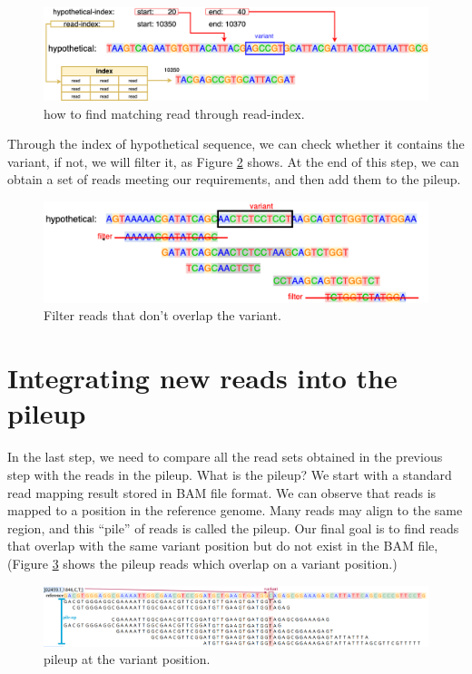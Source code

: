 \begin{figure}[H]
\vspace{1em}
\includegraphics[width=1\columnwidth]{body/image/read-index.png}
\caption[read-index]{how to find matching read through read-index.}
\label{read-index}
\end{figure}

Through the index of hypothetical sequence, we can check whether it contains the variant, if not, we will filter it, as Figure \ref{filter-reads} shows.  At the end of this step, we can obtain a set of reads meeting our requirements, and then add them to the pileup.

\begin{figure}[H]
\includegraphics[width=1\columnwidth]{body/image/filter-reads.png}
\caption[Filter reads]{Filter reads that don't overlap the variant.}
\label{filter-reads}
\end{figure}

\section{Integrating new reads into the pileup}
In the last step, we need to compare all the read sets obtained in the previous step with the reads in the pileup. What is the pileup?
We start with a standard read mapping result stored in BAM file format.  We can observe that reads is mapped to a position in the reference genome. Many reads may align to the same region, and this ``pile'' of reads is called the pileup. Our final goal is to find reads that overlap with the same variant position but do not exist in the BAM file, (Figure \ref{exp-pileup} shows the pileup reads which overlap on a variant position.)

\begin{figure}[H]
\vspace*{1em}
\includegraphics[width=1\columnwidth]{body/image/exp-pileup.png}
\caption[pileup]{pileup at the variant position.}
\label{exp-pileup}
\end{figure}

